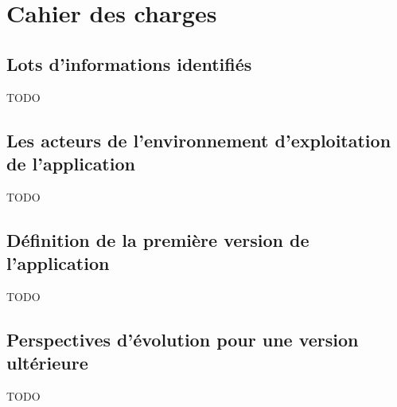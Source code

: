 \chapter{Cahier des charges}
\label{ch:specifications}





\section{Lots d'informations identifiés}
\label{sec:identified-information-packages}

    TODO

\section{Les acteurs de l'environnement d'exploitation de l'application}
\label{sec:application-operation-actors}

    TODO

\section{Définition de la première version de l'application}
\label{sec:first-version-definition}

    TODO

\section{Perspectives d'évolution pour une version ultérieure}
\label{sec:future-release-outlook}

    TODO
